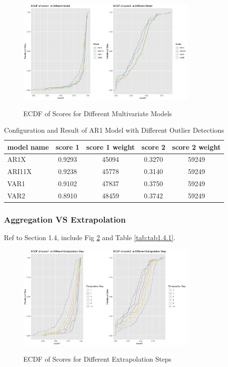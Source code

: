 \documentclass{article}
\begin{document}
\begin{figure}[htbp]
\caption{ECDF of Scores for Different Multivariate Models}
\centering
\includegraphics[width = 0.8\textwidth]{images/ECDFofscoresatDifferentModelOfAR1X,ARI11X,VAR1,VAR2.png}
\label{fig:fig1.3.7}
\end{figure}

\begin{table}[htbp]
  \begin{center}
    \caption{Configuration and Result of AR1 Model with Different Outlier Detections}
    \label{tab:tab1.3.7}
    \begin{tabular}{l|*{4}{c}}
      \textbf{model name} & \textbf{score 1} & \textbf{score 1 weight} & \textbf{score 2} & \textbf{score 2 weight} \\
      \hline
      AR1X & 0.9293 & 45094 & 0.3270 & 59249\\
      ARI11X & 0.9238 & 45778 & 0.3140 & 59249\\
      VAR1 & 0.9102 & 47837 & 0.3750 & 59249\\
      VAR2 & 0.8910 & 48459 & 0.3742 & 59249\\
    \end{tabular}
  \end{center}
\end{table}

\subsubsection{Aggregation VS Extrapolation}
Ref to Section 1.4, include Fig \ref{fig:fig1.4.1} and Table \ref{tab:tab1.4.1}.

\begin{figure}[htbp]
\caption{ECDF of Scores for Different Extrapolation Steps}
\centering
\includegraphics[width = 0.8\textwidth]{images/ECDFofscoresatDifferentExtrapolationStepOfAR1,840,1,3.png}
\label{fig:fig1.4.1}
\end{figure}
\end{document}
